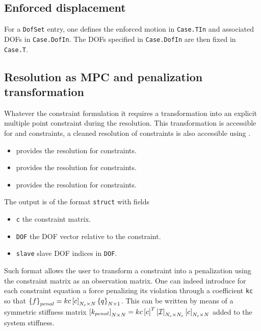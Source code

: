 \subsection{Enforced displacement} %


For a {\tt DofSet} entry, one defines the enforced motion in {\tt Case.TIn} and associated DOFs in {\tt Case.DofIn}. The DOFs specified in {\tt Case.DofIn} are then fixed in {\tt Case.T}.


\subsection{Resolution as MPC and penalization transformation} %

Whatever the constraint formulation it requires a transformation into an explicit multiple point constraint during the resolution. This transformation is accessible for  and \rigid constraints, a cleaned resolution of  constraints is also accessible using \fempc.

\begin{itemize}
\item {} provides the resolution for  constraints.
\item {} provides the resolution for \rigid constraints.
\item {} provides the resolution for  constraints.
\end{itemize}

The output is of the format {\tt struct} with fields

\begin{itemize}
\item {\tt c} the constraint matrix.
\item {\tt DOF} the DOF vector relative to the constraint.
\item {\tt slave} slave DOF indices in {\tt DOF}.
\end{itemize}

Such format allows the user to transform a constraint into a penalization using the constraint matrix as an observation matrix. One can indeed introduce for each constraint equation a force penalizing its violation through a coefficient {\tt kc} so that $\left\{f\right\}_{penal} = kc \left[c\right]_{N_c \times N} \left\{q\right\}_{N \times 1}$. This can be written by means of a symmetric stiffness matrix $\left[k_{penal}\right]_{N \times N} = kc \left[c\right]^T \left[\mathcal{I}\right]_{N_c \times N_c} \left[c\right]_{N_c \times N}$ added to the system stiffness.


